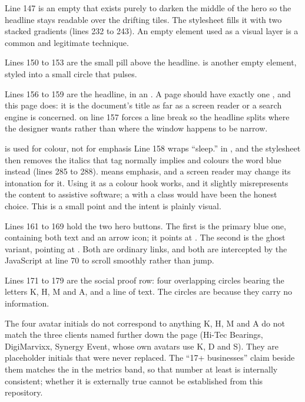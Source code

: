 Line 147 is an empty  that exists purely to darken the middle of the
hero so the headline stays readable over the drifting tiles. The stylesheet fills
it with two stacked gradients (lines 232 to 243). An empty element used as a
visual layer is a common and legitimate technique.

Lines 150 to 153 are the small pill above the headline.  is
another empty element, styled into a small circle that pulses.

Lines 156 to 159 are the headline, in an . A page should have exactly
one , and this page does: it is the document's title as far as a screen
reader or a search engine is concerned.  on line 157 forces a line
break so the headline splits where the designer wants rather than where the window
happens to be narrow.

\begin{honest}{ is used for colour, not for emphasis}
Line 158 wraps ``sleep.'' in , and the stylesheet then removes the
italics that tag normally implies and colours the word blue instead (lines 285 to
288).  means emphasis, and a screen reader may change its intonation
for it. Using it as a colour hook works, and it slightly misrepresents the
content to assistive software; a  with a class would have been the
honest choice. This is a small point and the intent is plainly visual.
\end{honest}

Lines 161 to 169 hold the two hero buttons. The first is the primary blue one,
containing both text and an arrow icon; it points at . The second is
the ghost variant, pointing at . Both are ordinary links, and
both are intercepted by the JavaScript at line 70 to scroll smoothly rather than
jump.

Lines 171 to 179 are the social proof row: four overlapping circles bearing the
letters K, H, M and A, and a line of text. The circles are 
because they carry no information.

\begin{honest}{The four avatar initials do not correspond to anything}
K, H, M and A do not match the three clients named further down the page (Hi-Tec
Bearings, DigiMarvixx, Synergy Event, whose own avatars use K, D and S). They are
placeholder initials that were never replaced. The ``17+ businesses'' claim beside
them matches the  in the metrics band, so that number at
least is internally consistent; whether it is externally true cannot be
established from this repository.
\end{honest}

